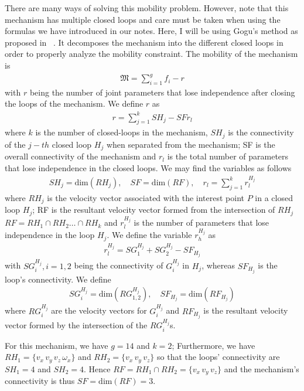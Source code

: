 There are many ways of solving this mobility problem. However, note that this mechanism has multiple closed loops and care must be taken when using the formulas we have introduced in our notes. Here, I will be using Gogu's method as proposed in ~\cite{Gogu}. It decomposes the mechanism into the different closed loops in order to properly analyze the mobility constraint. The mobility of the mechanism is 
%
\begin{align}
	\mathfrak{M} = \sum_{i=1}^{g} f_i - r
\end{align}
%
with $r$ being the number of joint parameters that lose independence after closing the loops of the mechanism. We define $r$ as 
%
\begin{align}
	r = \sum_{j=1}^{k}SH_j - SF  r_l
\end{align}
%
where $k$ is the number of closed-loops in the mechanism, $SH_j$ is the connectivity of the $j-th$ closed loop $H_j$ when separated from  the mechanism; SF is the overall connectivity of the mechanism and $r_l$ is the total number of parameters that lose independence in the closed loops. We may find the variables as follows
%
\begin{align}
	SH_j = \text{dim}(RH_j), \quad SF = \text{dim} (RF), \quad r_l = \sum_{j=1}^{k} r_l^{H_j}
\end{align}
%
where $RH_j$ is the velocity vector associated with the interest point $P$ in a closed loop $H_j$; RF is the resultant velocity vector formed from the intersection of $RH_j$ \ie $RF = RH_1 \cap RH_2 \ldots \cap RH_k$ and $r_l^{H_j}$ is the number of parameters that lose independence in the loop $H_j$. We define the variable $r_h^{H_j}$ as 
%
\begin{align}
	r_l^{H_j} = SG_1^{H_j} + SG_2^{H_j} - SF_{H_j} 
\end{align}
%
with $SG_i^{H_j}, i = 1,2$ being the connectivity of $G_i^{H_j}$ in $H_j$, whereas $SF_{H_j}$ is the loop's connectivity. We define
%
\begin{align}
	SG_i^{H_j} = \text{dim} \left(RG_{1,2}^{H_j}\right), \quad SF_{H_j} = \text{dim}\left(RF_{H_j}\right)
\end{align}
%
where $RG_i^{H_j}$ are the velocity vectors for $G_i^{H_j}$ and $RF_{H_j}$ is the resultant velocity vector formed by the intersection of the $RG_i^{H_j}$s.

For this mechanism, we have $g=14$ and $k=2$; Furthermore, we have $RH_1 = \{v_x \, v_y \, v_z \, \omega_x\}$ and $RH_2 = \{v_x\, v_y \, v_z \}$ so that the loops' connectivity are $SH_1 = 4$ and $SH_2 = 4$. Hence $RF = RH_1 \cap RH_2 = \{v_x \, v_y \, v_z\}$ and the mechanism's connectivity is thus $SF = \text{dim} (RF) = 3$.

